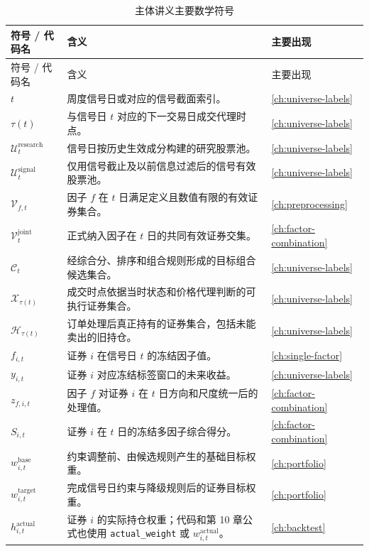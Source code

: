 \begingroup
\footnotesize
\setlength{\tabcolsep}{3pt}
\begin{longtable}{@{}p{3.2cm}p{9.0cm}p{2.8cm}@{}}
\caption{主体讲义主要数学符号}\label{tab:appA-symbols}\\
\toprule
符号 / 代码名 & 含义 & 主要出现 \\
\midrule
\endfirsthead
\toprule
符号 / 代码名 & 含义 & 主要出现 \\
\midrule
\endhead
\(t\) & 周度信号日或对应的信号截面索引。 & \cref{ch:universe-labels} \\
\(\tau(t)\) & 与信号日 \(t\) 对应的下一交易日成交代理时点。 & \cref{ch:universe-labels} \\
\(\mathcal{U}^{\mathrm{research}}_t\) & 信号日按历史生效成分构建的研究股票池。 & \cref{ch:universe-labels} \\
\(\mathcal{U}^{\mathrm{signal}}_t\) & 仅用信号截止及以前信息过滤后的信号有效股票池。 & \cref{ch:universe-labels} \\
\(\mathcal{V}_{f,t}\) & 因子 \(f\) 在 \(t\) 日满足定义且数值有限的有效证券集合。 & \cref{ch:preprocessing} \\
\(\mathcal{V}^{\mathrm{joint}}_t\) & 正式纳入因子在 \(t\) 日的共同有效证券交集。 & \cref{ch:factor-combination} \\
\(\mathcal{C}_t\) & 经综合分、排序和组合规则形成的目标组合候选集合。 & \cref{ch:universe-labels} \\
\(\mathcal{X}_{\tau(t)}\) & 成交时点依据当时状态和价格代理判断的可执行证券集合。 & \cref{ch:universe-labels} \\
\(\mathcal{H}_{\tau(t)}\) & 订单处理后真正持有的证券集合，包括未能卖出的旧持仓。 & \cref{ch:universe-labels} \\
\(f_{i,t}\) & 证券 \(i\) 在信号日 \(t\) 的冻结因子值。 & \cref{ch:single-factor} \\
\(y_{i,t}\) & 证券 \(i\) 对应冻结标签窗口的未来收益。 & \cref{ch:universe-labels} \\
\(z_{f,i,t}\) & 因子 \(f\) 对证券 \(i\) 在 \(t\) 日方向和尺度统一后的处理值。 & \cref{ch:factor-combination} \\
\(S_{i,t}\) & 证券 \(i\) 在 \(t\) 日的冻结多因子综合得分。 & \cref{ch:factor-combination} \\
\(w^{\mathrm{base}}_{i,t}\) & 约束调整前、由候选规则产生的基础目标权重。 & \cref{ch:portfolio} \\
\(w^{\mathrm{target}}_{i,t}\) & 完成信号日约束与降级规则后的证券目标权重。 & \cref{ch:portfolio} \\
\(h^{\mathrm{actual}}_{i,t}\) & 证券 \(i\) 的实际持仓权重；代码和第 10 章公式也使用 \texttt{actual\_weight} 或 \(w^{\mathrm{actual}}_{i,t}\)。 & \cref{ch:backtest} \\

\end{longtable}
